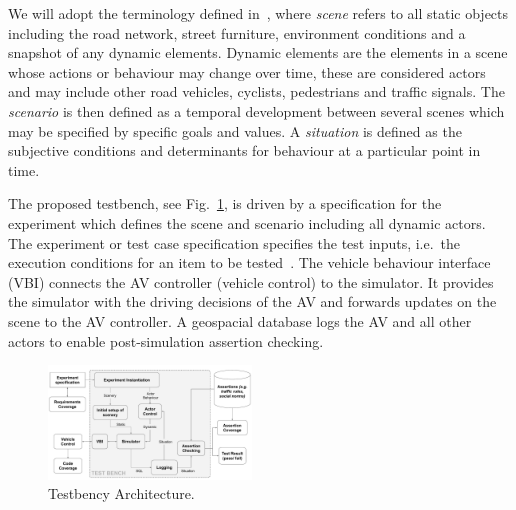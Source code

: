 \documentclass[letterpaper, 10 pt, journal, twoside]{IEEEtran}
\begin{document}
We will adopt the terminology defined in~\cite{Ulbrich2015}, where \textit{scene} refers to all static objects including the road network, street furniture, environment conditions and a snapshot of any dynamic elements. Dynamic elements are the elements in a scene whose actions or behaviour may change over time, these are considered actors and may include other road vehicles, cyclists, pedestrians and traffic signals. 
%
The \textit{scenario} is then defined as a temporal development between several scenes which may be specified by specific goals and values.
%
A \textit{situation} is defined as the subjective conditions and determinants for behaviour at a particular point in time. 

The proposed testbench, see Fig.~\ref{f:testbench}, is driven by a specification for the experiment which defines the scene and scenario including all dynamic actors. 
%
The experiment or test case specification specifies the test inputs, i.e.\ the execution conditions for an item to be tested~\cite{StandardsBoard1990}.
%
The vehicle behaviour interface (VBI) connects the AV controller (vehicle control) to the simulator. It provides the simulator with the driving decisions of the AV and forwards updates on the scene to the AV controller. 
%
A geospacial database logs the AV and all other actors to enable post-simulation assertion checking. 


\begin{figure}[!t]
	\centering
\includegraphics[width=0.48\textwidth]{TestBenchMonotone.pdf}
	\caption{Testbency Architecture.}
	\label{f:testbench}
\end{figure}
\end{document}
